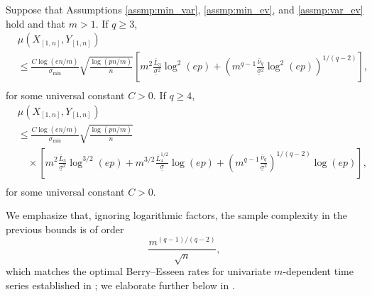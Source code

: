 \documentclass[aos]{imsart}
\begin{document}
\begin{corollary} \label{thm:m_dep_berry_esseen}
Suppose that Assumptions \eqref{assmp:min_var}, \eqref{assmp:min_ev}, and \eqref{assmp:var_ev} hold and that $m > 1$. %
If $q \geq 3$, 
\begin{equation*}
\begin{aligned}
    & \mu\left( X_{[1,n]}, Y_{[1,n]} \right) \\
    & \leq \frac{C\log\left(en/m\right)}{\sigma_{\min}} \sqrt{\frac{\log(pn/m)}{n}} 
    \left[
        m^{2} \frac{\bar{L}_3}{\underline{\sigma}^2} \log^{2}(ep) 
        + \left( m^{q-1} \frac{\bar\nu_q}{\underline\sigma^2} 
        \log^2(ep) \right)^{1/(q-2)} 
    \right], \\
\end{aligned}
\end{equation*}
for some universal constant $C > 0$. If $q \geq 4$,
\begin{equation*}
\begin{aligned}
    & \mu\left( X_{[1,n]}, Y_{[1,n]} \right) \\
    & \leq \frac{C\log\left(en/m\right)}{\sigma_{\min}} \sqrt{\frac{\log(pn/m)}{n}}  \\ 
    & \quad \times \left[
        m^{2} \frac{\bar{L}_3}{\underline{\sigma}^2} \log^{3/2}(ep)
        + m^{3/2} \frac{\bar{L}_4^{1/2}}{\underline{\sigma}} \log(ep)
        + \left( m^{q-1} \frac{\bar\nu_q}{\underline\sigma^2} 
        \right)^{1/(q-2)} \log(ep) 
    \right], \\
\end{aligned}
\end{equation*}
for some universal constant $C > 0$.
\end{corollary}
{We emphasize that, ignoring logarithmic factors, the sample complexity in the previous bounds is of order
\begin{equation*}
    \frac{m^{(q-1)/(q-2)}}{\sqrt{n}},
\end{equation*}
which matches the optimal Berry--Esseen rates for univariate $m$-dependent time series established in \cite{shergin1980convergence}; we  elaborate further below in .}

\end{document}
